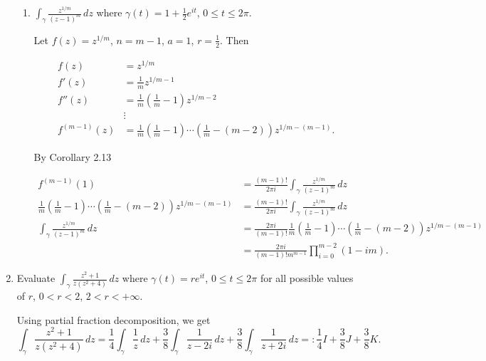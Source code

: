 \documentclass[11pt,oneside,english]{amsart}
\theoremstyle{definition}
\begin{document}
\begin{enumerate}[leftmargin=*]
\begin{enumerate}
\item $\displaystyle \int_\gamma \frac{z^{1/m}}{(z-1)^m}\,dz$ where $\gamma(t)=1+\frac{1}{2}e^{it}$, $0\leq t\leq 2\pi$.

Let $f(z)=z^{1/m}$, $n=m-1$, $a=1$, $r=\frac{1}{2}$. Then 

\begin{align*}
f(z)&=z^{1/m}\\[2mm]
f'(z)&=\frac{1}{m}z^{1/m-1}\\[2mm]
f''(z)&=\frac{1}{m}\left(\frac{1}{m}-1\right)z^{1/m-2}\\[2mm]
&\vdots\\[2mm]
f^{(m-1)}(z)&=\frac{1}{m}\left(\frac{1}{m}-1\right)\cdots \left(\frac{1}{m}-(m-2)\right)z^{1/m-(m-1)}.
\end{align*}

By Corollary 2.13

\begin{align*}
f^{(m-1)}(1)&=\frac{(m-1)!}{2\pi i}\int_\gamma \frac{z^{1/m}}{(z-1)^m}\,dz\\[2mm]
\frac{1}{m}\left(\frac{1}{m}-1\right)\cdots \left(\frac{1}{m}-(m-2)\right)z^{1/m-(m-1)}&=\frac{(m-1)!}{2\pi i}\int_\gamma \frac{z^{1/m}}{(z-1)^m}\,dz\\[2mm]
\int_\gamma \frac{z^{1/m}}{(z-1)^m}\,dz&=\frac{2\pi i}{(m-1)!}\frac{1}{m}\left(\frac{1}{m}-1\right)\cdots \left(\frac{1}{m}-(m-2)\right)z^{1/m-(m-1)}\\[2mm]
&=\frac{2\pi i}{(m-1)!m^{m-1}}\prod_{i=0}^{m-2}(1-im).
\end{align*}


\end{enumerate}


\item Evaluate $\displaystyle \int_\gamma \frac{z^2+1}{z(z^2+4)}\,dz$ where $\gamma(t)=re^{it}$, $0\leq t\leq 2\pi$ for all possible values of $r$, $0<r<2$, $2<r<+\infty$.


Using partial fraction decomposition, we get
\[
\int_\gamma \frac{z^2+1}{z(z^2+4)}\,dz=\frac{1}{4}\int_\gamma\frac{1}{z}\,dz+\frac{3}{8}\int_\gamma \frac{1}{z-2i}\,dz+\frac{3}{8}\int_\gamma \frac{1}{z+2i}\,dz=:\frac{1}{4}I+\frac{3}{8}J+\frac{3}{8}K.
\]


\end{enumerate}
\end{document}
